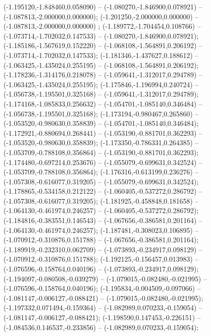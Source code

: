  (-1.195120,-1.848460,0.058090) -- (-1.080270,-1.846900,0.078921) -- (-1.087813,-2.000000,0.000000);
 (-1.201250,-2.000000,0.000000) -- (-1.087813,-2.000000,0.000000) ;
 (-1.189772,-1.704454,0.108766) -- (-1.073714,-1.702032,0.147533) -- (-1.080270,-1.846900,0.078921);
 (-1.185186,-1.567619,0.152220) -- (-1.068108,-1.564891,0.206192) -- (-1.073714,-1.702032,0.147533);
 (-1.181346,-1.437627,0.188612) -- (-1.063425,-1.435024,0.255195) -- (-1.068108,-1.564891,0.206192);
 (-1.178236,-1.314176,0.218078) -- (-1.059641,-1.312017,0.294789) -- (-1.063425,-1.435024,0.255195);
 (-1.175846,-1.196994,0.240724) -- (-1.056738,-1.195501,0.325168) -- (-1.059641,-1.312017,0.294789);
 (-1.174168,-1.085833,0.256632) -- (-1.054701,-1.085140,0.346484) -- (-1.056738,-1.195501,0.325168);
 (-1.173194,-0.980467,0.265860) -- (-1.053520,-0.980630,0.358839) -- (-1.054701,-1.085140,0.346484);
 (-1.172921,-0.880694,0.268441) -- (-1.053190,-0.881701,0.362293) -- (-1.053520,-0.980630,0.358839);
 (-1.173350,-0.786331,0.264385) -- (-1.053709,-0.788108,0.356864) -- (-1.053190,-0.881701,0.362293);
 (-1.174480,-0.697214,0.253676) -- (-1.055079,-0.699631,0.342524) -- (-1.053709,-0.788108,0.356864);
 (-1.176316,-0.613199,0.236276) -- (-1.057308,-0.616077,0.319205) -- (-1.055079,-0.699631,0.342524);
 (-1.178865,-0.534158,0.212122) -- (-1.060405,-0.537272,0.286792) -- (-1.057308,-0.616077,0.319205);
 (-1.181925,-0.458848,0.181658) -- (-1.064130,-0.461974,0.246257) -- (-1.060405,-0.537272,0.286792);
 (-1.184816,-0.383551,0.146543) -- (-1.067656,-0.386581,0.201164) -- (-1.064130,-0.461974,0.246257);
 (-1.187481,-0.308023,0.106895) -- (-1.070912,-0.310876,0.151788) -- (-1.067656,-0.386581,0.201164);
 (-1.189919,-0.232310,0.062709) -- (-1.073893,-0.234917,0.098129) -- (-1.070912,-0.310876,0.151788);
 (-1.192125,-0.156457,0.013983) -- (-1.076596,-0.158764,0.040196) -- (-1.073893,-0.234917,0.098129);
 (-1.194097,-0.080508,-0.039279) -- (-1.079015,-0.082480,-0.021995) -- (-1.076596,-0.158764,0.040196);
 (-1.195834,-0.004509,-0.097066) -- (-1.081147,-0.006127,-0.088421) -- (-1.079015,-0.082480,-0.021995);
 (-1.197332,0.071494,-0.159364) -- (-1.082989,0.070233,-0.159054) -- (-1.081147,-0.006127,-0.088421);
 (-1.198590,0.147453,-0.226151) -- (-1.084536,0.146537,-0.233856) -- (-1.082989,0.070233,-0.159054);
